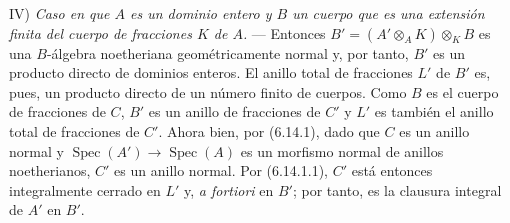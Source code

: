 IV) \emph{Caso en que $A$ es un dominio entero y $B$ un cuerpo que
es una extensión finita del cuerpo de fracciones $K$ de $A$.} ---
Entonces $B'=(A'\otimes_A K)\otimes_K B$ es una $B$-álgebra
noetheriana geométricamente normal y, por tanto, $B'$ es un producto directo
de dominios enteros. El anillo total de fracciones $L'$ de $B'$ es,
pues, un producto directo de un número finito de cuerpos. Como $B$
es el cuerpo de fracciones de $C$, $B'$ es un anillo de fracciones de
$C'$ y $L'$ es también el anillo total de fracciones de $C'$. Ahora
bien, por (6.14.1), dado que $C$ es un anillo normal y
$\operatorname{Spec}(A')\to\operatorname{Spec}(A)$ es un morfismo
normal de anillos noetherianos, $C'$ es un anillo normal. Por
(6.14.1.1), $C'$ está entonces integralmente cerrado en $L'$ y, \emph{a fortiori} en $B'$; por tanto, es la clausura integral de $A'$ en
$B'$.

